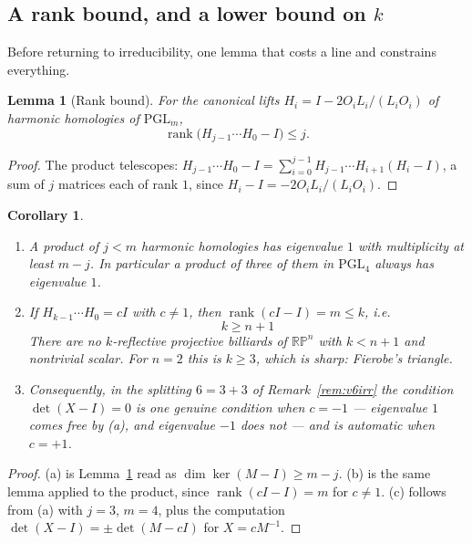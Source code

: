 \documentclass[11pt,a4paper]{article}
\theoremstyle{plain}
\newtheorem{lemma}[theorem]{Lemma}
\newtheorem{corollary}[theorem]{Corollary}
\theoremstyle{definition}
\theoremstyle{remark}
\newcommand{\PGL}{\mathrm{PGL}}
\newcommand{\rk}{\operatorname{rank}}
\begin{document}
\subsection{A rank bound, and a lower bound on \texorpdfstring{$k$}{k}}

Before returning to irreducibility, one lemma that costs a line and constrains
everything.

\begin{lemma}[Rank bound]\label{lem:rankbound}
For the canonical lifts $H_i=I-2O_iL_i/(L_iO_i)$ of harmonic homologies of $\PGL_m$,
\[
  \rk\bigl(H_{j-1}\cdots H_0-I\bigr)\le j .
\]
\end{lemma}

\begin{proof}
The product telescopes:
$H_{j-1}\cdots H_0-I=\sum_{i=0}^{j-1}H_{j-1}\cdots H_{i+1}(H_i-I)$, a sum of $j$
matrices each of rank $1$, since $H_i-I=-2O_iL_i/(L_iO_i)$.
\end{proof}

\begin{corollary}\label{cor:rankbound}
\begin{enumerate}[label=\textup{(\alph*)},nosep]
  \item A product of $j<m$ harmonic homologies has eigenvalue $1$ with multiplicity
        at least $m-j$. In particular a product of three of them in $\PGL_4$ always
        has eigenvalue $1$.
  \item If $H_{k-1}\cdots H_0=cI$ with $c\neq1$, then $\rk(cI-I)=m\le k$, i.e.
        \[
          \boxed{\;k\ge n+1\;}
        \]
        There are no $k$-reflective projective billiards of $\mathbb{RP}^n$ with
        $k<n+1$ and nontrivial scalar. For $n=2$ this is $k\ge3$, which is sharp:
        Fierobe's triangle.
  \item Consequently, in the splitting $6=3+3$ of Remark~\ref{rem:v6irr} the
        condition $\det(X-I)=0$ is one genuine condition when $c=-1$ --- eigenvalue
        $1$ comes free by \textup{(a)}, and eigenvalue $-1$ does not --- and is
        automatic when $c=+1$.
\end{enumerate}
\end{corollary}

\begin{proof}
(a) is Lemma~\ref{lem:rankbound} read as $\dim\ker(M-I)\ge m-j$. (b) is the same
lemma applied to the product, since $\rk(cI-I)=m$ for $c\neq1$. (c) follows from (a)
with $j=3$, $m=4$, plus the computation
$\det(X-I)=\pm\det(M-cI)$ for $X=cM^{-1}$.
\end{proof}
\end{document}
